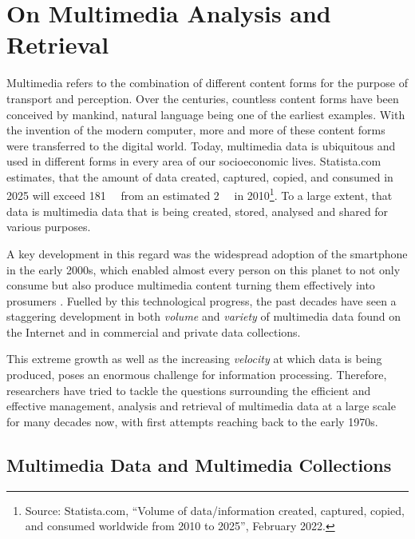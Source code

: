 \chapter{On Multimedia Analysis and Retrieval}
\label{chapter:theory_multimedia_analysis_and_retrieval}

Multimedia refers to the combination of different content forms for the purpose of transport and perception. Over the centuries, countless content forms have been conceived by mankind, natural language being one of the earliest examples. With the invention of the modern computer, more and more of these content forms were transferred to the digital world. Today, multimedia data is ubiquitous and used in different forms in every area of our socioeconomic lives. Statista.com estimates, that the amount of data created, captured, copied, and consumed in 2025 will exceed \SI{181}{\zetta\byte} from an estimated \SI{2}{\zetta\byte} in 2010\footnote{Source: Statista.com, ``Volume of data/information created, captured, copied, and consumed worldwide from 2010 to 2025'', February 2022.}. To a large extent, that data is multimedia data that is being created, stored, analysed and shared for various purposes.

A key development in this regard was the widespread adoption of the smartphone in the early 2000s, which enabled almost every person on this planet to not only consume but also produce multimedia content turning them effectively into prosumers \cite{Ritzer:2010Production,Ritzer2012:Coming}. Fuelled by this technological progress, the past decades have seen a staggering development in both \emph{volume} and \emph{variety} of multimedia data found on the Internet and in commercial and private data collections.

This extreme growth as well as the increasing \emph{velocity} at which data is being produced, poses an enormous challenge for information processing. Therefore, researchers have tried to tackle the questions surrounding the efficient and effective management, analysis and retrieval of multimedia data at a large scale for many decades now, with first attempts reaching back to the early 1970s.

\section{Multimedia Data and Multimedia Collections}
\label{section:multmedia_data}

